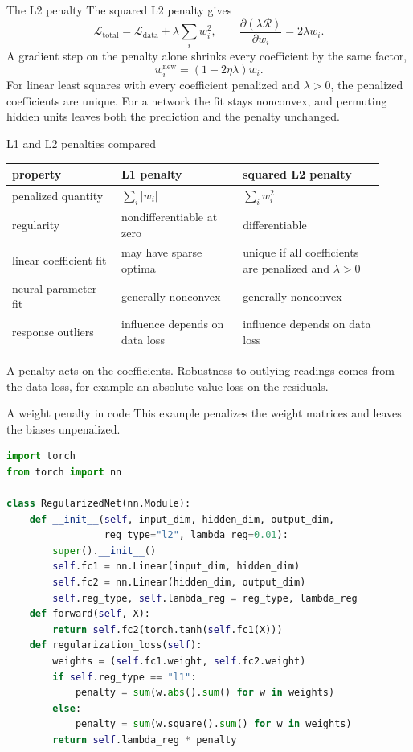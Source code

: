 \documentclass[aspectratio=169]{beamer}
\begin{document}
\begin{frame}{The L2 penalty}
The squared L2 penalty gives
\[
\mathcal L_{\text{total}}=\mathcal L_{\text{data}}+\lambda\sum_iw_i^2,\qquad
\frac{\partial(\lambda\mathcal R)}{\partial w_i}=2\lambda w_i.
\]
A gradient step on the penalty alone shrinks every coefficient by the same factor,
\[
w_i^{\text{new}}=(1-2\eta\lambda)w_i.
\]
For linear least squares with every coefficient penalized and $\lambda>0$, the penalized coefficients are unique.
For a network the fit stays nonconvex, and permuting hidden units leaves both the prediction and the penalty unchanged.
\end{frame}

\begin{frame}{L1 and L2 penalties compared}
\small
\begin{tabular}{@{}p{0.27\linewidth}p{0.30\linewidth}p{0.35\linewidth}@{}}
\toprule
property & L1 penalty & squared L2 penalty\\
\midrule
penalized quantity & $\sum_i|w_i|$ & $\sum_iw_i^2$\\
regularity & nondifferentiable at zero & differentiable\\
linear coefficient fit & may have sparse optima & unique if all coefficients are penalized and $\lambda>0$\\
neural parameter fit & generally nonconvex & generally nonconvex\\
response outliers & influence depends on data loss & influence depends on data loss\\
\bottomrule
\end{tabular}
\medskip

A penalty acts on the coefficients.
Robustness to outlying readings comes from the data loss, for example an absolute-value loss on the residuals.
\end{frame}

\begin{frame}[fragile]{A weight penalty in code}
This example penalizes the weight matrices and leaves the biases unpenalized.
\begin{lstlisting}[language=Python]
import torch
from torch import nn

class RegularizedNet(nn.Module):
    def __init__(self, input_dim, hidden_dim, output_dim,
                 reg_type="l2", lambda_reg=0.01):
        super().__init__()
        self.fc1 = nn.Linear(input_dim, hidden_dim)
        self.fc2 = nn.Linear(hidden_dim, output_dim)
        self.reg_type, self.lambda_reg = reg_type, lambda_reg
    def forward(self, X):
        return self.fc2(torch.tanh(self.fc1(X)))
    def regularization_loss(self):
        weights = (self.fc1.weight, self.fc2.weight)
        if self.reg_type == "l1":
            penalty = sum(w.abs().sum() for w in weights)
        else:
            penalty = sum(w.square().sum() for w in weights)
        return self.lambda_reg * penalty
\end{lstlisting}
\end{frame}
\end{document}
